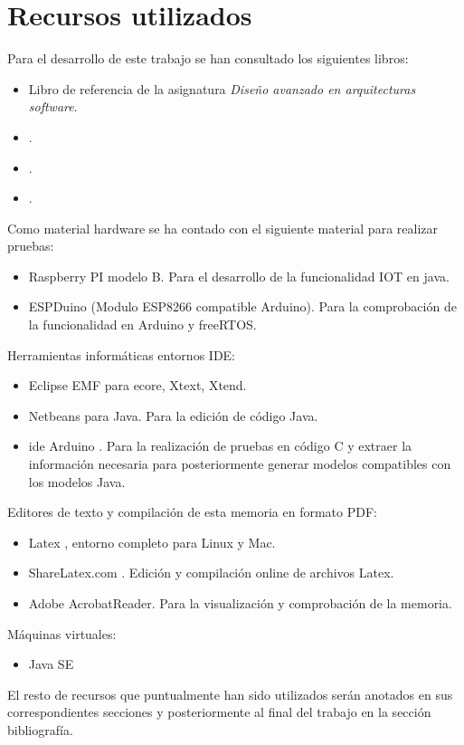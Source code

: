 \section{Recursos utilizados}


Para el desarrollo de este trabajo se han consultado los siguientes libros:

\begin{itemize}

\item {} Libro de referencia de la asignatura \textit{Diseño avanzado en arquitecturas software}.
\item {}.
\item {}.
\item {}.

\end{itemize}

Como material hardware se ha contado con el siguiente material para realizar pruebas:

\begin{itemize}
\item Raspberry PI \cite{raspberrypi} modelo B. Para el desarrollo de la funcionalidad IOT en java.
\item ESPDuino (Modulo ESP8266 compatible Arduino). Para la comprobación de la funcionalidad en Arduino y freeRTOS.
\end{itemize}

Herramientas informáticas entornos IDE:
\begin{itemize}
\item Eclipse \cite{Eclipse} EMF \cite{EclipseEMF} para \gls{ecore}, Xtext, Xtend.
\item Netbeans para Java. Para la edición de código Java.
\item \gls{ide} Arduino \cite{arduino}. Para la realización de pruebas en código C y extraer la información necesaria para posteriormente generar modelos compatibles con los modelos Java.
\end{itemize}

Editores de texto y compilación de esta memoria en formato PDF:
\begin{itemize}
\item Latex \cite{Latex}, entorno completo para Linux y Mac.
\item ShareLatex.com \cite{sharelatex}. Edición y compilación online de archivos Latex.
\item Adobe AcrobatReader. Para la visualización y comprobación de la memoria.
\end{itemize}

Máquinas virtuales:
\begin{itemize}
\item Java SE
\end{itemize}


El resto de recursos que puntualmente han sido utilizados serán anotados en sus correspondientes secciones y posteriormente al final del trabajo en la sección bibliografía.
